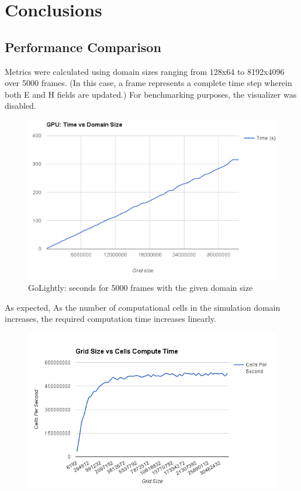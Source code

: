 \chapter{Conclusions} \label{ch:conclusions}


\section{Performance Comparison}

Metrics were calculated using domain sizes ranging from 128x64 to 8192x4096 over 5000 frames. (In this case, a frame represents a complete time step wherein both E and H fields are updated.) For benchmarking purposes, the visualizer was disabled.

\begin{figure}[H]
	\centering
	\includegraphics[width=\textwidth,
	keepaspectratio]{gpu_time_vs_domain_size.png}
	\caption{GoLightly: seconds for 5000 frames with the given domain size}
	\label{fig:gpuTimeVsDomainSize}
\end{figure}

As expected, As the number of computational cells in the simulation domain increases, the required computation time increases linearly.

\begin{figure}[H]
	\centering
	\includegraphics[width=\textwidth,
	keepaspectratio]{grid-cells-vs-compute-time.png}
	\label{fig:gridSizeVsComputeTime}
\end{figure}

